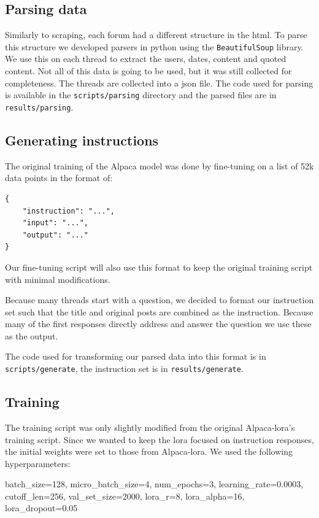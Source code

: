 \documentclass[fleqn,moreauthors,10pt]{ds_report}
\begin{document}
\subsection*{Parsing data}

Similarly to scraping, each forum had a different structure in the html. To parse this structure we developed parsers in python using the \texttt{BeautifulSoup} library. We use this on each thread to extract the users, dates, content and quoted content. Not all of this data is going to be used, but it was still collected for completeness. The threads are collected into a json file. The code used for parsing is available in the \texttt{scripts/parsing} directory and the parsed files are in \texttt{results/parsing}.

\subsection*{Generating instructions}

The original training of the Alpaca model was done by fine-tuning on a list of 52k data points in the format of:

\lstset{language=Python}
\begin{lstlisting}
{
    "instruction": "...",
    "input": "...",
    "output": "..."
}
\end{lstlisting}

Our fine-tuning script will also use this format to keep the original training script with minimal modifications.

Because many threads start with a question, we decided to format our instruction set such that the title and original posts are combined as the instruction. Because many of the first responses directly address and answer the question we use these as the output.

The code used for transforming our parsed data into this format is in \texttt{scripts/generate}, the instruction set is in \texttt{results/generate}.

\subsection*{Training}

The training script was only slightly modified from the original Alpaca-lora's training script. Since we wanted to keep the lora focused on instruction responses, the initial weights were set to those from Alpaca-lora. We used the following hyperparameters:
\begin{center}
batch\_size=128,
micro\_batch\_size=4,
num\_epochs=3,
learning\_rate=0.0003,
cutoff\_len=256,
val\_set\_size=2000,
lora\_r=8,
lora\_alpha=16,
lora\_dropout=0.05
\end{center}
\end{document}
